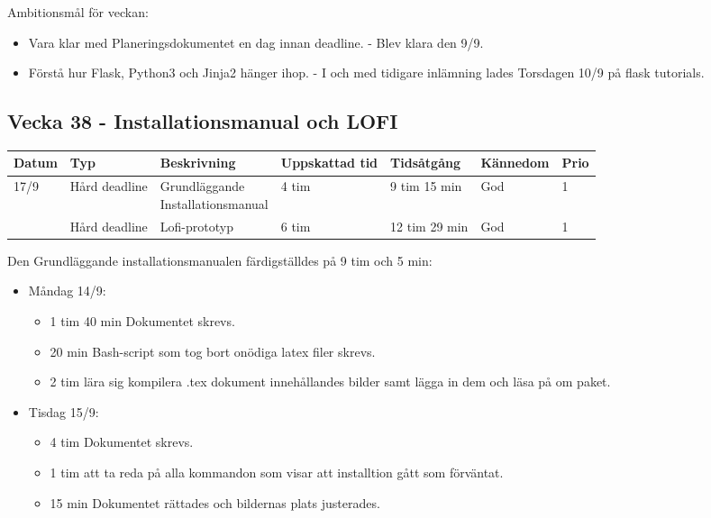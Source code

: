\documentclass{TDP003mall}
\begin{document}
      Ambitionsmål för veckan:
      \begin{itemize}
      \item Vara klar med Planeringsdokumentet en dag innan deadline. - Blev klara den 9/9.
      \item Förstå hur Flask, Python3 och Jinja2 hänger ihop. - I och med tidigare inlämning lades Torsdagen 10/9 på flask tutorials.
      \end{itemize}
      

\newpage


\subsection*{Vecka 38 - Installationsmanual och LOFI}
\begin{tabularx}{\linewidth}{|l|l|l|l|l|l|l|}
	\hline
	Datum & Typ           & Beskrivning                       & Uppskattad tid & Tidsåtgång    & Kännedom & Prio\\
	\hline                                                    
	17/9  & Hård deadline &\makecell[tl]{Grundläggande \\Installationsmanual} & 4 tim             & 9 tim 15 min  & God      & 1\\
	\hline                                                    
          & Hård deadline & Lofi-prototyp                     & 6 tim             & 12 tim 29 min & God      & 1\\
	\hline
\end{tabularx}

Den Grundläggande installationsmanualen färdigställdes på 9 tim och 5 min:
\begin{itemize}
	\item Måndag 14/9:
	\begin{itemize}
		\item 1 tim 40 min Dokumentet skrevs.
		\item 20 min Bash-script som tog bort onödiga latex filer skrevs.
		\item 2 tim lära sig kompilera .tex dokument innehållandes bilder samt lägga in dem och läsa på om paket.
	\end{itemize}
	\item Tisdag 15/9:
	\begin{itemize}
		\item 4 tim Dokumentet skrevs.
		\item 1 tim att ta reda på alla kommandon som visar att installtion gått som förväntat.
		\item 15 min Dokumentet rättades och bildernas plats justerades.
	\end{itemize}
\end{itemize}
\end{document}

